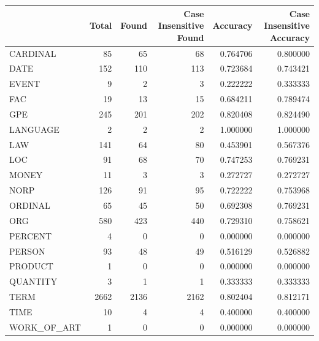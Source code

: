 \begin{tabular}{lrrrrr}
\toprule
 & Total & Found & Case Insensitive Found & Accuracy & Case Insensitive Accuracy \\
\midrule
CARDINAL & 85 & 65 & 68 & 0.764706 & 0.800000 \\
DATE & 152 & 110 & 113 & 0.723684 & 0.743421 \\
EVENT & 9 & 2 & 3 & 0.222222 & 0.333333 \\
FAC & 19 & 13 & 15 & 0.684211 & 0.789474 \\
GPE & 245 & 201 & 202 & 0.820408 & 0.824490 \\
LANGUAGE & 2 & 2 & 2 & 1.000000 & 1.000000 \\
LAW & 141 & 64 & 80 & 0.453901 & 0.567376 \\
LOC & 91 & 68 & 70 & 0.747253 & 0.769231 \\
MONEY & 11 & 3 & 3 & 0.272727 & 0.272727 \\
NORP & 126 & 91 & 95 & 0.722222 & 0.753968 \\
ORDINAL & 65 & 45 & 50 & 0.692308 & 0.769231 \\
ORG & 580 & 423 & 440 & 0.729310 & 0.758621 \\
PERCENT & 4 & 0 & 0 & 0.000000 & 0.000000 \\
PERSON & 93 & 48 & 49 & 0.516129 & 0.526882 \\
PRODUCT & 1 & 0 & 0 & 0.000000 & 0.000000 \\
QUANTITY & 3 & 1 & 1 & 0.333333 & 0.333333 \\
TERM & 2662 & 2136 & 2162 & 0.802404 & 0.812171 \\
TIME & 10 & 4 & 4 & 0.400000 & 0.400000 \\
WORK_OF_ART & 1 & 0 & 0 & 0.000000 & 0.000000 \\
\bottomrule
\end{tabular}
